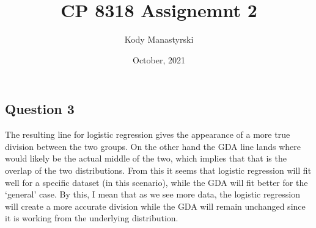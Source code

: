 \documentclass{article}
\author{Kody Manastyrski}
\date{October, 2021}
\title{CP 8318 Assignemnt 2}
\begin{document}
\maketitle

\section{}
\subsection{Question 3}
The resulting line for logistic regression gives the appearance of a more true
division between the two groups.
On the other hand the GDA line lands where would likely be the actual middle of
the two, which implies that that is the overlap of the two distributions.
From this it seems that logistic regression will fit well for a specific dataset
(in this scenario), while the GDA will fit better for the `general' case. 
By this, I mean that as we see more data, the logistic regression will create a
more accurate division while the GDA will remain unchanged since it is working 
from the underlying distribution.
\end{document}
